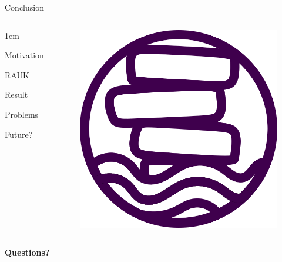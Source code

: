 \begin{frame}{Conclusion}
    \begin{columns}
        \begin{itemize-size}{1em}
            \item Motivation
            \item RAUK
            \item Result
            \item Problems
            \item Future?
        \end{itemize-size}
        
        \begin{figure}
            \centering
            \includegraphics[scale=0.25]{pictures/RAUK.png}
        \end{figure}
    \end{columns}
    
\end{frame}

\begin{frame}
    \centering
    \huge \textbf{Questions?} 
\end{frame}
